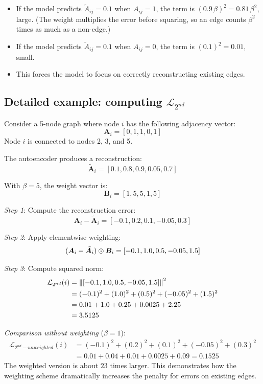 \begin{notechapter}
\begin{intuition}
\begin{itemize}
    \item If the model predicts $\tilde{A}_{ij} = 0.1$ when $A_{ij} = 1$, the term is $(0.9\,\beta)^2 = 0.81\,\beta^2$, large. (The weight multiplies the error before squaring, so an edge counts $\beta^2$ times as much as a non-edge.)
    \item If the model predicts $\tilde{A}_{ij} = 0.1$ when $A_{ij} = 0$, the term is $(0.1)^2 = 0.01$, small.
    \item This forces the model to focus on correctly reconstructing existing edges.
\end{itemize}
\end{intuition}

\subsection{Detailed example: computing $\mathcal{L}_{2^{nd}}$}

\begin{example}
Consider a 5-node graph where node $i$ has the following adjacency vector:
\[
\bm{A}_i = [0, 1, 1, 0, 1]
\]
Node $i$ is connected to nodes 2, 3, and 5.

The autoencoder produces a reconstruction:
\[
\tilde{\bm{A}}_i = [0.1, 0.8, 0.9, 0.05, 0.7]
\]

With $\beta = 5$, the weight vector is:
\[
\bm{B}_i = [1, 5, 5, 1, 5]
\]

\emph{Step 1}: Compute the reconstruction error:
\[
\bm{A}_i - \tilde{\bm{A}}_i = [-0.1, 0.2, 0.1, -0.05, 0.3]
\]

\emph{Step 2}: Apply elementwise weighting:
\[
(\bm{A}_i - \tilde{\bm{A}}_i) \odot \bm{B}_i = [-0.1, 1.0, 0.5, -0.05, 1.5]
\]

\emph{Step 3}: Compute squared norm:
\begin{align*}
\mathcal{L}_{2^{nd}}(i) &= \left\|[-0.1, 1.0, 0.5, -0.05, 1.5]\right\|^2 \\
&= (-0.1)^2 + (1.0)^2 + (0.5)^2 + (-0.05)^2 + (1.5)^2 \\
&= 0.01 + 1.0 + 0.25 + 0.0025 + 2.25 \\
&= 3.5125
\end{align*}

\emph{Comparison without weighting} ($\beta = 1$):
\begin{align*}
\mathcal{L}_{2^{nd}-{unweighted}}(i) &= (-0.1)^2 + (0.2)^2 + (0.1)^2 + (-0.05)^2 + (0.3)^2 \\
&= 0.01 + 0.04 + 0.01 + 0.0025 + 0.09 = 0.1525
\end{align*}
The weighted version is about $23$ times larger. This demonstrates how the weighting scheme dramatically increases the penalty for errors on existing edges.
\end{example}


\end{notechapter}
